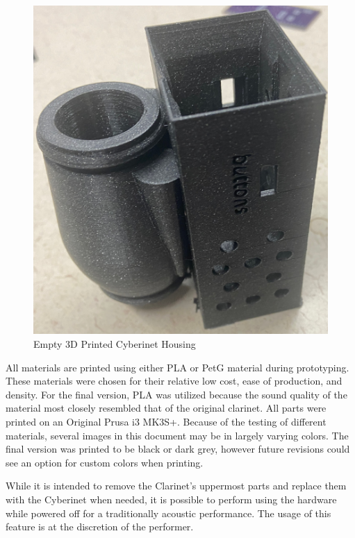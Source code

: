 \begin{center}
    \begin{figure}
        \centering
        \includegraphics[scale=0.1]{diagrams/builtUnits/emptyCase.JPG}
        \caption{Empty 3D Printed Cyberinet Housing}
        \label{fig:cybernetCase}
    \end{figure}
\end{center}

All materials are printed using either PLA or PetG material during prototyping. These materials were chosen for their relative low cost, ease of production, and density. For the final version, PLA was utilized because the sound quality of the material most closely resembled that of the original clarinet. All parts were printed on an Original Prusa i3 MK3S+. Because of the testing of different materials, several images in this document may be in largely varying colors. The final version was printed to be black or dark grey, however future revisions could see an option for custom colors when printing. 

While it is intended to remove the Clarinet's uppermost parts and replace them with the Cyberinet when needed, it is possible to perform using the hardware while powered off for a traditionally acoustic performance. The usage of this feature is at the discretion of the performer.

